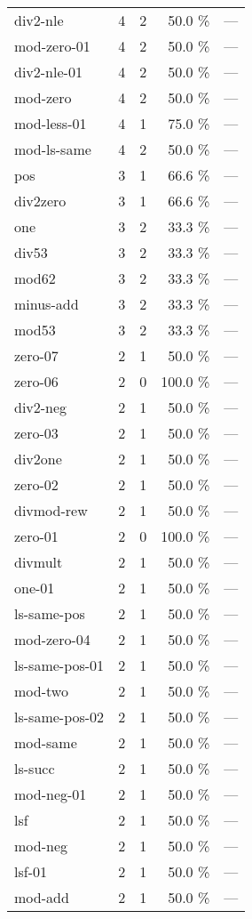 \documentclass[a4paper]{article}
\begin{document}
\begin{supertabular}{l|r|r|r|r}
div2-nle & 4 & 2 & 50.0 \% & ---\\
mod-zero-01 & 4 & 2 & 50.0 \% & ---\\
div2-nle-01 & 4 & 2 & 50.0 \% & ---\\
mod-zero & 4 & 2 & 50.0 \% & ---\\
mod-less-01 & 4 & 1 & 75.0 \% & ---\\
mod-ls-same & 4 & 2 & 50.0 \% & ---\\
pos & 3 & 1 & 66.6 \% & ---\\
div2zero & 3 & 1 & 66.6 \% & ---\\
one & 3 & 2 & 33.3 \% & ---\\
div53 & 3 & 2 & 33.3 \% & ---\\
mod62 & 3 & 2 & 33.3 \% & ---\\
minus-add & 3 & 2 & 33.3 \% & ---\\
mod53 & 3 & 2 & 33.3 \% & ---\\
zero-07 & 2 & 1 & 50.0 \% & ---\\
zero-06 & 2 & 0 & 100.0 \% & ---\\
div2-neg & 2 & 1 & 50.0 \% & ---\\
zero-03 & 2 & 1 & 50.0 \% & ---\\
div2one & 2 & 1 & 50.0 \% & ---\\
zero-02 & 2 & 1 & 50.0 \% & ---\\
divmod-rew & 2 & 1 & 50.0 \% & ---\\
zero-01 & 2 & 0 & 100.0 \% & ---\\
divmult & 2 & 1 & 50.0 \% & ---\\
one-01 & 2 & 1 & 50.0 \% & ---\\
ls-same-pos & 2 & 1 & 50.0 \% & ---\\
mod-zero-04 & 2 & 1 & 50.0 \% & ---\\
ls-same-pos-01 & 2 & 1 & 50.0 \% & ---\\
mod-two & 2 & 1 & 50.0 \% & ---\\
ls-same-pos-02 & 2 & 1 & 50.0 \% & ---\\
mod-same & 2 & 1 & 50.0 \% & ---\\
ls-succ & 2 & 1 & 50.0 \% & ---\\
mod-neg-01 & 2 & 1 & 50.0 \% & ---\\
lsf & 2 & 1 & 50.0 \% & ---\\
mod-neg & 2 & 1 & 50.0 \% & ---\\
lsf-01 & 2 & 1 & 50.0 \% & ---\\
mod-add & 2 & 1 & 50.0 \% & ---\\

\end{supertabular}
\end{document}
